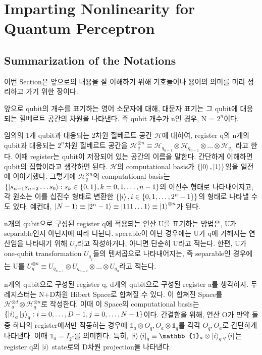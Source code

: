 \section{Imparting Nonlinearity for Quantum Perceptron}

\subsection{Summarization of the Notations}

이번 Section은 앞으로의 내용을 잘 이해하기 위해 기호들이나 용어의 의미를 미리 정리하고 가기 위한 장이다.

앞으로 qubit의 개수를 표기하는 영어 소문자에 대해, 대문자 표기는 그 qubit에 대응되는 힐베르트 공간의 차원을 나타낸다.
즉 qubit 개수가 n인 경우, N = \(2^n\)이다.

임의의 1개 qubit과 대응되는 2차원 힐베르트 공간 \(\mathcal{H}\)에 대하여, register q의 n개의 qubit과 대응되는 \(2^n\)차원 힐베르트 공간을 \(\mathcal{H}_q^{\otimes n} \equiv \mathcal{H}_{q_{n-1}} \otimes \mathcal{H}_{q_{n-2}} \otimes \dots \otimes \mathcal{H}_{q_{0}}\) 라고 한다.
이때 register는 qubit이 저장되어 있는 공간의 이름을 말한다. 간단하게 이해하면 qubit의 집합이라고 생각하면 된다.
\(\mathcal{H}\)의 computational basis가 \(\{ \ket{0}, \ket{1} \}\)임을 일전에 이야기했다. 그렇기에 \(\mathcal{H}_q^{\otimes n}\)의 computational basis는 \(\{ \ket{s_{n-1}s_{n-2}\dots s_0} : s_k \in \{0,1\}, k = 0,1,\dots , n-1\}\)의 이진수 형태로 나타내어지고, 각 원소는 이를 십진수 형태로 변환한 \(\{ \ket{i}, i \in \{0,1,\dots,2^n-1\} \} \)의 형태로 나타낼 수도 있다.
예컨대, \(\ket{N-1} \equiv \ket{2^n-1} \equiv \ket{111\dots 1} \equiv \ket{1}^{\otimes n}\)가 된다.

n개의 qubit으로 구성된 register q에 적용되는 연산 U를 표기하는 방법은, U가 separable인지 아닌지에 따라 나뉜다.
sperable이 아닌 경우에는 U가 q에 가해지는 연산임을 나타내기 위해 \(U_q\)라고 작성하거나, 아니면 단순히 U라고 적는다.
한편, U가 one-qubit transformation \(U_{q_j}\)들의 텐서곱으로 나타내어지는, 즉 separable인 경우에는 U를 \(U_q^{\otimes n} \equiv U_{q_{n-1}} \otimes U_{q_{n-2}} \otimes \dots \otimes U_{q_{0}}\)라고 적는다.

n개의 qubit으로 구성된 register q, d개의 qubit으로 구성된 register a를 생각하자. 두 레지스터는 N+D차원 Hibert Space로 합쳐질 수 있다. 이 합쳐진 Space를 \(\mathcal{H}_a^{\otimes d} \otimes \mathcal{H}_q^{\otimes n}\)로 작성한다. 이때 이 Space의 computational basis는 \(\{ \ket{i}_a \ket{j}_q : i = 0,\dots,D-1, j = 0,\dots,N-1\}\)이다.
간결함을 위해, 연산 O가 만약 둘 중 하나의 register에서만 작동하는 경우에 \(\mathbb{1}_a \otimes O_q, O_a \otimes \mathbb{1}_q\)를 각각 \(O_q, O_a\)로 간단하게 나타낸다. 이때 \(\mathbb{1}_a = I_{2^d}\)를 의미한다.
특히, \(\ket{i}\bra{i}_q \equiv \mathbb{1}_a \otimes \ket{i}_q {_q}\bra{i}\)는 register q의 \(\ket{i}\) state로의 D차원 projection을 나타낸다.

